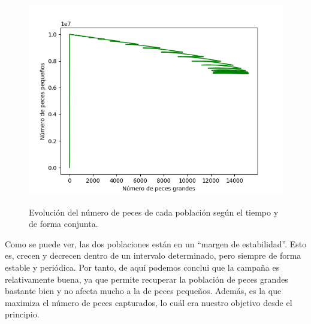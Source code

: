 \documentclass[11pt,a4paper]{report}
\begin{document}
\begin{figure}[H]
\begin{minipage}{.5\textwidth}
  \label{fig:peces-c-g}
\end{minipage}
\begin{minipage}{0.5\textwidth}
  \centering
  \includegraphics[scale=0.4]{img/peces-c-pg.png}
  \label{fig:peces-c-pg}
\end{minipage}
\caption{Evolución del número de peces de cada población según el tiempo y de forma conjunta.}
\label{fig:peces-corto}
\end{figure}

Como se puede ver, las dos poblaciones están en un ``margen de estabilidad''. Esto es, crecen y decrecen dentro de un intervalo
determinado, pero siempre de forma estable y periódica. Por tanto, de aquí podemos conclui que la campaña es relativamente buena,
ya que permite recuperar la población de peces grandes bastante bien y no afecta mucho a la de peces pequeños. Además, es
la que maximiza el número de peces capturados, lo cuál era nuestro objetivo desde el principio.
\end{document}
